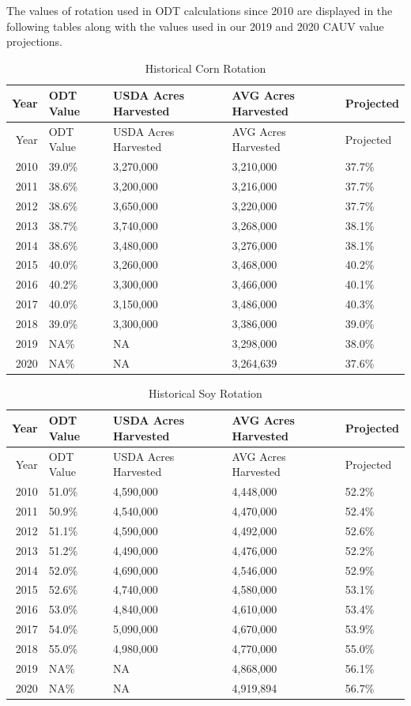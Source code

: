 \documentclass[]{article}
\begin{document}
The values of rotation used in ODT calculations since 2010 are displayed
in the following tables along with the values used in our 2019 and 2020
CAUV value projections.

\begin{longtable}[]{@{}rllll@{}}
\caption{Historical Corn Rotation}\tabularnewline
\toprule
Year & ODT Value & USDA Acres Harvested & AVG Acres Harvested &
Projected\tabularnewline
\midrule
\endfirsthead
\toprule
Year & ODT Value & USDA Acres Harvested & AVG Acres Harvested &
Projected\tabularnewline
\midrule
\endhead
2010 & 39.0\% & 3,270,000 & 3,210,000 & 37.7\%\tabularnewline
2011 & 38.6\% & 3,200,000 & 3,216,000 & 37.7\%\tabularnewline
2012 & 38.6\% & 3,650,000 & 3,220,000 & 37.7\%\tabularnewline
2013 & 38.7\% & 3,740,000 & 3,268,000 & 38.1\%\tabularnewline
2014 & 38.6\% & 3,480,000 & 3,276,000 & 38.1\%\tabularnewline
2015 & 40.0\% & 3,260,000 & 3,468,000 & 40.2\%\tabularnewline
2016 & 40.2\% & 3,300,000 & 3,466,000 & 40.1\%\tabularnewline
2017 & 40.0\% & 3,150,000 & 3,486,000 & 40.3\%\tabularnewline
2018 & 39.0\% & 3,300,000 & 3,386,000 & 39.0\%\tabularnewline
2019 & NA\% & NA & 3,298,000 & 38.0\%\tabularnewline
2020 & NA\% & NA & 3,264,639 & 37.6\%\tabularnewline
\bottomrule
\end{longtable}

\begin{longtable}[]{@{}rllll@{}}
\caption{Historical Soy Rotation}\tabularnewline
\toprule
Year & ODT Value & USDA Acres Harvested & AVG Acres Harvested &
Projected\tabularnewline
\midrule
\endfirsthead
\toprule
Year & ODT Value & USDA Acres Harvested & AVG Acres Harvested &
Projected\tabularnewline
\midrule
\endhead
2010 & 51.0\% & 4,590,000 & 4,448,000 & 52.2\%\tabularnewline
2011 & 50.9\% & 4,540,000 & 4,470,000 & 52.4\%\tabularnewline
2012 & 51.1\% & 4,590,000 & 4,492,000 & 52.6\%\tabularnewline
2013 & 51.2\% & 4,490,000 & 4,476,000 & 52.2\%\tabularnewline
2014 & 52.0\% & 4,690,000 & 4,546,000 & 52.9\%\tabularnewline
2015 & 52.6\% & 4,740,000 & 4,580,000 & 53.1\%\tabularnewline
2016 & 53.0\% & 4,840,000 & 4,610,000 & 53.4\%\tabularnewline
2017 & 54.0\% & 5,090,000 & 4,670,000 & 53.9\%\tabularnewline
2018 & 55.0\% & 4,980,000 & 4,770,000 & 55.0\%\tabularnewline
2019 & NA\% & NA & 4,868,000 & 56.1\%\tabularnewline
2020 & NA\% & NA & 4,919,894 & 56.7\%\tabularnewline
\bottomrule
\end{longtable}
\end{document}
